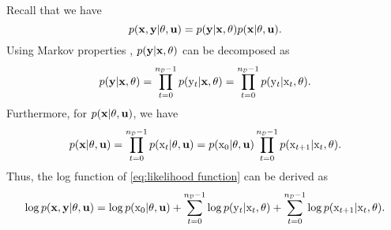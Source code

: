 Recall that we have
\begin{equation}\label{eq:likelihood function}
    p(\mathbf{x},\mathbf{y}|{ \mathrm{\theta} },\mathbf{u}) = p(\mathbf{y}|\mathbf{x},{ \mathrm{\theta} })p(\mathbf{x}|{ \mathrm{\theta} },\mathbf{u}).
\end{equation}
Using Markov properties \cite{ross2014introduction}, $p(\mathbf{y}|\mathbf{x},{ \mathrm{\theta} })$ 
can be decomposed as
\begin{equation}
    p(\mathbf{y}|\mathbf{x},\vctheta) 
    = 
    \prod_{t=0}^{\nD-1} p(\vcy_t|\mathbf{x},\vctheta)
    = 
    \prod_{t=0}^{\nD-1} p(\vcy_t|\vcx_t,\vctheta).
\end{equation}
Furthermore, for $p(\mathbf{x}|{ \mathrm{\theta} },\mathbf{u})$, we have
\begin{equation}
    p(\mathbf{x}|\vctheta,\mathbf{u}) 
    = 
    \prod_{t=0}^{\nsmD-1} p(\vcx_t|\vctheta,\mathbf{u})
    = 
    p(\vcx_0|\vctheta,\mathbf{u}) \prod_{t=0}^{\nD-1} p(\vcx_{t+1}|\vcx_{t},\vctheta).
\end{equation}
Thus, the log function of \eqref{eq:likelihood function} can be derived as 
\begin{equation}\label{eq:log-likelihood function}
    \begin{split}
        \log p(\mathbf{x},\mathbf{y}|\vctheta,\mathbf{u}) = \log p(\vcx_0|\vctheta,\mathbf{u}) + \sum_{t=0}^{\nD-1}\log p(\vcy_t|\vcx_t,\vctheta) + \sum_{t=0}^{\nD-1}\log p(\vcx_{t+1}|\vcx_{t},\vctheta).
    \end{split}
\end{equation} 

